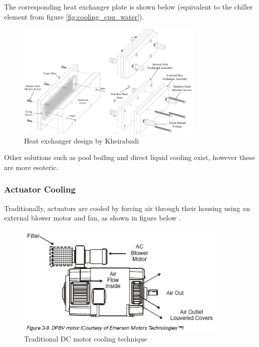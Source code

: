 The corresponding heat exchanger plate is shown below (equivalent to the chiller element from figure \ref{fig:cooling_cpu_water}).

\begin{figure}[H]
    \centering
    \includegraphics[width=0.8\textwidth]{Sections/LiteratureReview/img/cooling/std_cpu_water_exchanger.png}
    \caption{Heat exchanger design by Kheirabadi \cite{cherom_kheirabadi_experimental_2017}}
    \label{fig:cooling_cpu_water_experimental_exchanger}
\end{figure}

Other solutions such as pool boiling and direct liquid cooling exist, however these are more esoteric.

\subsubsection{Actuator Cooling}

Traditionally, actuators are cooled by forcing air through their housing using an external blower motor and fan, as shown in figure below \cite{noauthor_chapter_nodate}.

\begin{figure}[H]
    \centering
    \includegraphics[width=0.9\textwidth]{Sections/LiteratureReview/img/cooling/std_motor_cooling.png}
    \caption{Traditional DC motor cooling technique \cite{noauthor_chapter_nodate}}
    \label{fig:cooling_motor_standard}
\end{figure}

